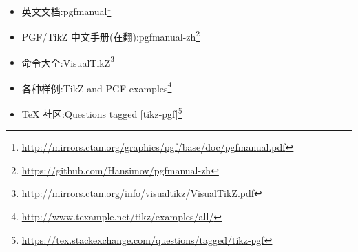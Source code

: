 \documentclass[a4paper,punct=banjiao,twoside]{ctexrep}
\theoremstyle{plain}
\theoremstyle{definition}
\theoremstyle{remark}
\begin{document}
\begin{itemize}
    \item 英文文档:pgfmanual\footnote{\href{http://mirrors.ctan.org/graphics/pgf/base/doc/pgfmanual.pdf}{http://mirrors.ctan.org/graphics/pgf/base/doc/pgfmanual.pdf}}
    \item PGF/TikZ 中文手册(在翻):pgfmanual-zh\footnote{\href{https://github.com/Hansimov/pgfmanual-zh}{https://github.com/Hansimov/pgfmanual-zh}}
    \item 命令大全:VisualTikZ\footnote{\href{http://mirrors.ctan.org/info/visualtikz/VisualTikZ.pdf}{http://mirrors.ctan.org/info/visualtikz/VisualTikZ.pdf}}
     \item 各种样例:TikZ and PGF examples\footnote{\href{http://www.texample.net/tikz/examples/all/}{http://www.texample.net/tikz/examples/all/}}
     \item TeX 社区:Questions tagged [tikz-pgf]\footnote{\href{https://tex.stackexchange.com/questions/tagged/tikz-pgf}{https://tex.stackexchange.com/questions/tagged/tikz-pgf}}
\end{itemize}
\end{document}
